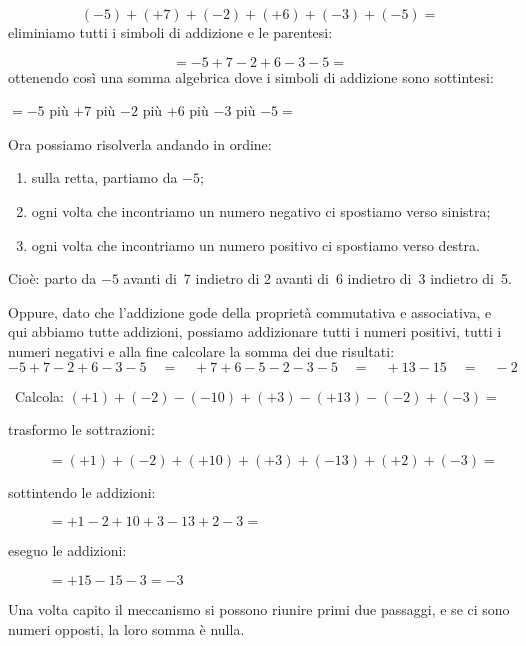 \vspace{-1em}
\[(-5)+(+7)+(-2)+(+6)+(-3)+(-5) =\]
eliminiamo tutti i simboli di addizione e le parentesi: 

\vspace{-1em}
\[=-5+7-2+6-3-5 =\]
ottenendo così una somma algebrica dove i simboli di addizione sono 
sottintesi: 

\vspace{-1em}
\begin{center}
\(= -5\) \quad più \quad \(+7\) \quad più \quad \(-2\) \quad più \quad 
\(+6\) \quad più \quad \(-3\) \quad più \quad \(-5 =\)\\
\end{center}

Ora possiamo risolverla andando in ordine:
\begin{enumerate} [nosep]
\item sulla retta, partiamo da \(-5\);
\item ogni volta che incontriamo un numero negativo ci spostiamo verso 
sinistra; 
\item ogni volta che incontriamo un numero positivo ci spostiamo verso 
destra.
\end{enumerate}

\sommalgebrica

Cioè: parto da \(-5\) avanti di~7 indietro di 2 avanti di~6 indietro 
di~3 indietro di~5.

Oppure, dato che l'addizione gode della proprietà commutativa e associativa, 
e qui abbiamo tutte addizioni,
possiamo addizionare tutti i numeri positivi, tutti i numeri negativi e alla 
fine calcolare la somma dei due risultati:
\[-5+7-2+6-3-5 \quad=\quad +7+6-5-2-3-5 \quad=\quad +13 -15 \quad=\quad -2\]

\begin{esempio}{}{}
~Calcola: \((+1)+(-2)-(-10)+(+3)-(+13)-(-2)+(-3)=\) 
\begin{description}
\item [trasformo le sottrazioni: \quad ] 
\(=(+1)+(-2)+(+10)+(+3)+(-13)+(+2)+(-3)=\)
\item [sottintendo le addizioni: \quad ] \(=+1-2+10+3-13+2-3=\)
\item [eseguo le addizioni: \qquad ~~\, ] \(=+15-15-3=-3\)
\end{description}
\end{esempio}

Una volta capito il meccanismo si possono riunire primi due passaggi, 
e se ci sono numeri opposti, la loro somma è nulla.

